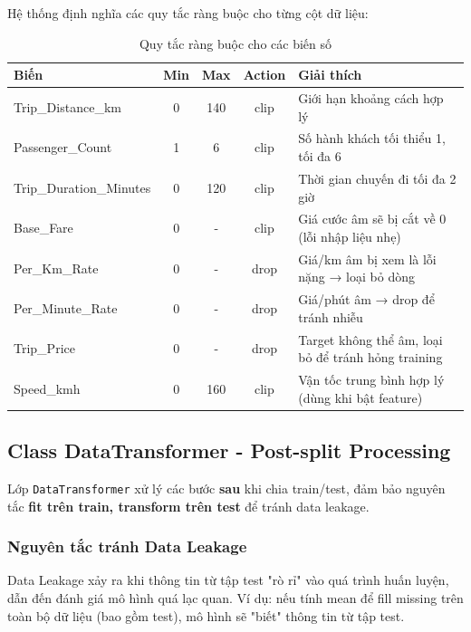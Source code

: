 \documentclass[12pt,a4paper]{article}
\begin{document}
Hệ thống định nghĩa các quy tắc ràng buộc cho từng cột dữ liệu:

\begin{table}[H]
\centering
\caption{Quy tắc ràng buộc cho các biến số}
\label{tab:constraint_rules}
\begin{tabular}{|l|c|c|c|p{4cm}|}
\hline
\textbf{Biến} & \textbf{Min} & \textbf{Max} & \textbf{Action} & \textbf{Giải thích} \\
\hline
Trip\_Distance\_km & 0 & 140 & clip & Giới hạn khoảng cách hợp lý \\
\hline
Passenger\_Count & 1 & 6 & clip & Số hành khách tối thiểu 1, tối đa 6 \\
\hline
Trip\_Duration\_Minutes & 0 & 120 & clip & Thời gian chuyến đi tối đa 2 giờ \\
\hline
Base\_Fare & 0 & - & clip & Giá cước âm sẽ bị cắt về 0 (lỗi nhập liệu nhẹ) \\
\hline
Per\_Km\_Rate & 0 & - & drop & Giá/km âm bị xem là lỗi nặng → loại bỏ dòng \\
\hline
Per\_Minute\_Rate & 0 & - & drop & Giá/phút âm → drop để tránh nhiễu \\
\hline
Trip\_Price & 0 & - & drop & Target không thể âm, loại bỏ để tránh hỏng training \\
\hline
Speed\_kmh & 0 & 160 & clip & Vận tốc trung bình hợp lý (dùng khi bật feature) \\
\hline
\end{tabular}
\end{table}

\subsection{Class DataTransformer - Post-split Processing}

Lớp \texttt{DataTransformer} xử lý các bước \textbf{sau} khi chia train/test, đảm bảo nguyên tắc \textbf{fit trên train, transform trên test} để tránh data leakage.

\subsubsection{Nguyên tắc tránh Data Leakage}

\begin{definitionbox}
Data Leakage xảy ra khi thông tin từ tập test "rò rỉ" vào quá trình huấn luyện, dẫn đến đánh giá mô hình quá lạc quan. Ví dụ: nếu tính mean để fill missing trên toàn bộ dữ liệu (bao gồm test), mô hình sẽ "biết" thông tin từ tập test.
\end{definitionbox}
\end{document}
